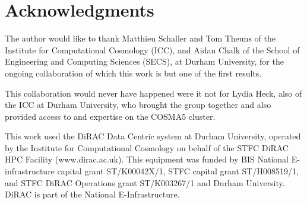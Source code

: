 \documentclass[final]{siamltex}
\begin{document}
\section*{Acknowledgments}

The author would like to thank Matthieu Schaller and Tom Theuns of the
Institute for Computational Cosmology (ICC), and Aidan Chalk of the
School of Engineering and Computing Sciences (SECS), at Durham University,
for the ongoing collaboration of which this work is but one of the first
results.

This collaboration would never have happened were it not for Lydia Heck,
also of the ICC at Durham University, who brought the group together 
and also provided access to and expertise 
on the COSMA5 cluster.

This work used the DiRAC Data Centric system at Durham University,
operated by the Institute for Computational Cosmology on behalf of the
STFC DiRAC HPC Facility (www.dirac.ac.uk). This equipment was funded by
BIS National E-infrastructure capital grant ST/K00042X/1, STFC capital
grant ST/H008519/1, and STFC DiRAC Operations grant ST/K003267/1 and
Durham University. DiRAC is part of the National E-Infrastructure.


\nopagebreak

\end{document}
